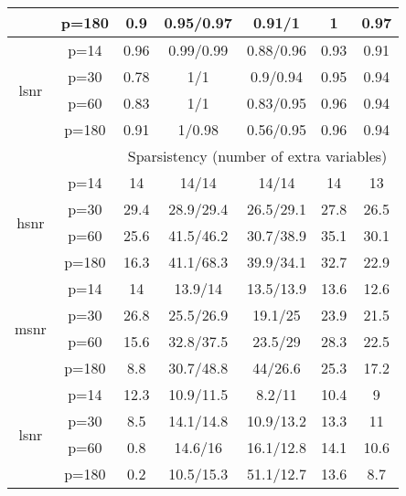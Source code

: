 \begin{table}[ht]
{\begin{tabular}{|c|c|ccccc|}
   & p=180 & 0.9 & 0.95/0.97 & 0.91/1 & 1 & 0.97 \\ 
  \midrule\multirow{4}[2]{*}{lsnr} & p=14 & 0.96 & 0.99/0.99 & 0.88/0.96 & 0.93 & 0.91 \\ 
   & p=30 & 0.78 & 1/1 & 0.9/0.94 & 0.95 & 0.94 \\ 
   & p=60 & 0.83 & 1/1 & 0.83/0.95 & 0.96 & 0.94 \\ 
   & p=180 & 0.91 & 1/0.98 & 0.56/0.95 & 0.96 & 0.94 \\ 
   \midrule 
 \multicolumn{1}{|c}{} &       & \multicolumn{5}{c|}{Sparsistency (number of extra variables)} \\
\midrule\multirow{4}[2]{*}{hsnr} & p=14 & 14 & 14/14 & 14/14 & 14 & 13 \\ 
   & p=30 & 29.4 & 28.9/29.4 & 26.5/29.1 & 27.8 & 26.5 \\ 
   & p=60 & 25.6 & 41.5/46.2 & 30.7/38.9 & 35.1 & 30.1 \\ 
   & p=180 & 16.3 & 41.1/68.3 & 39.9/34.1 & 32.7 & 22.9 \\ 
  \midrule\multirow{4}[2]{*}{msnr} & p=14 & 14 & 13.9/14 & 13.5/13.9 & 13.6 & 12.6 \\ 
   & p=30 & 26.8 & 25.5/26.9 & 19.1/25 & 23.9 & 21.5 \\ 
   & p=60 & 15.6 & 32.8/37.5 & 23.5/29 & 28.3 & 22.5 \\ 
   & p=180 & 8.8 & 30.7/48.8 & 44/26.6 & 25.3 & 17.2 \\ 
  \midrule\multirow{4}[2]{*}{lsnr} & p=14 & 12.3 & 10.9/11.5 & 8.2/11 & 10.4 & 9 \\ 
   & p=30 & 8.5 & 14.1/14.8 & 10.9/13.2 & 13.3 & 11 \\ 
   & p=60 & 0.8 & 14.6/16 & 16.1/12.8 & 14.1 & 10.6 \\ 
   & p=180 & 0.2 & 10.5/15.3 & 51.1/12.7 & 13.6 & 8.7 \\ 
   \bottomrule 
\end{tabular}
}
\end{table}
